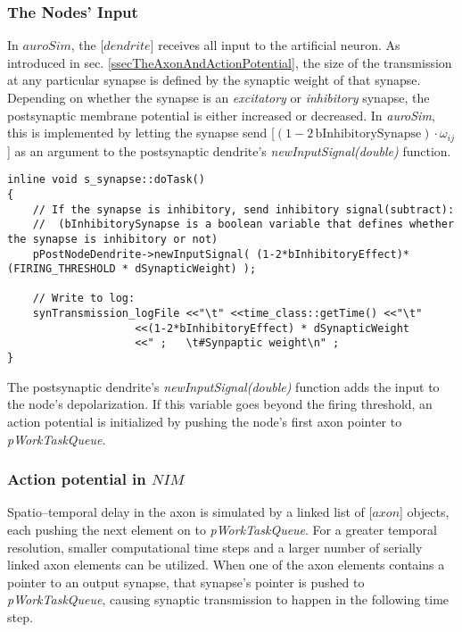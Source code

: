 		\subsubsection{The Nodes' Input}
		In $auroSim$, the [$dendrite$] receives all input to the artificial neuron.
		As introduced in sec. \ref{ssecTheAxonAndActionPotential}, the size of the transmission at any particular synapse is defined by the synaptic weight of that synapse.
		Depending on whether the synapse is an \emph{excitatory} or \emph{inhibitory} synapse, the postsynaptic membrane potential is either increased or decreased. %
		In \emph{auroSim}, this is implemented by letting the synapse send [$(1-2\, \text{bInhibitorySynapse})\cdot \omega_{ij}$] as an argument to the postsynaptic dendrite's \emph{newInputSignal(double)} function.
\begin{lstlisting}
inline void s_synapse::doTask()
{
	// If the synapse is inhibitory, send inhibitory signal(subtract):
	//  (bInhibitorySynapse is a boolean variable that defines whether the synapse is inhibitory or not)
 	pPostNodeDendrite->newInputSignal( (1-2*bInhibitoryEffect)*(FIRING_THRESHOLD * dSynapticWeight) );

	// Write to log:
	synTransmission_logFile <<"\t" <<time_class::getTime() <<"\t"
					<<(1-2*bInhibitoryEffect) * dSynapticWeight
					<<" ;   \t#Synpaptic weight\n" ;
}
\end{lstlisting}
		The postsynaptic dendrite's \emph{newInputSignal(double)} function adds the input to the node's depolarization.
		If this variable goes beyond the firing threshold, an action potential is initialized by pushing the node's first axon pointer to \emph{pWorkTaskQueue}.



		\subsubsection{Action potential in $NIM$}
		Spatio--temporal delay in the axon is simulated by a linked list of [$axon$] objects, each pushing the next element on to \emph{pWorkTaskQueue}. %
		For a greater temporal resolution, smaller computational time steps and a larger number of serially linked axon elements can be utilized.
		When one of the axon elements contains a pointer to an output synapse, that synapse's pointer is pushed to \emph{pWorkTaskQueue},
			causing synaptic transmission to happen in the following time step. %



